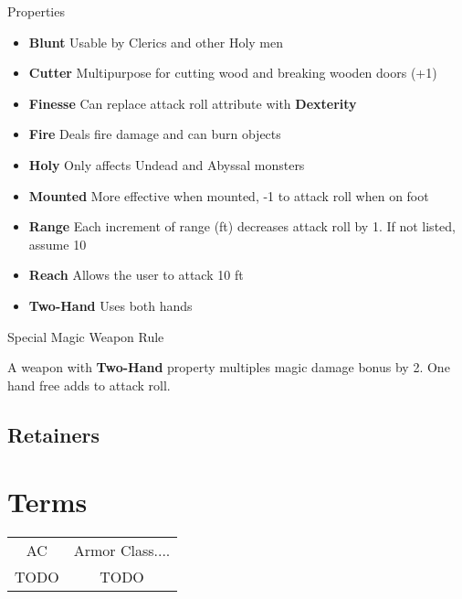 \documentclass[18pt]{article}
\begin{document}
\begin{multicols}{2}
\begin{mercHeading}
Properties
\end{mercHeading}
\begin{itemize}
\setlength\itemsep{0em}
	\item \textbf{Blunt} Usable by Clerics and other Holy men
	\item \textbf{Cutter} Multipurpose for cutting wood and breaking wooden doors (+1)
	\item \textbf{Finesse} Can replace attack roll attribute with \textbf{Dexterity}
	\item \textbf{Fire} Deals fire damage and can burn objects
	\item \textbf{Holy} Only affects Undead and Abyssal monsters
	\item \textbf{Mounted} More effective when mounted, -1 to attack roll when on foot
	\item \textbf{Range} Each increment of range (ft) decreases attack roll by 1. If not listed, assume 10
	\item \textbf{Reach} Allows the user to attack 10 ft
	\item \textbf{Two-Hand} Uses both hands
\end{itemize}
\begin{mercHeading}
Special Magic Weapon Rule
\end{mercHeading}
A weapon with \textbf{Two-Hand} property multiples magic damage bonus by 2. One hand free adds to attack roll.
\subsection*{Retainers}
\end{multicols}
\appendix
\section*{Terms}
\begin{tabular}{c c}

AC & Armor Class.... \\

TODO & TODO \\

\end{tabular}
\end{document}
